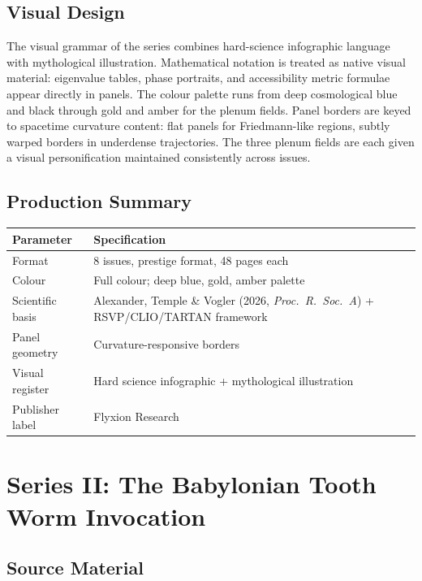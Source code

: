\documentclass[12pt, a4paper]{article}
\begin{document}
\subsection{Visual Design}

The visual grammar of the series combines hard-science infographic language with mythological illustration. Mathematical notation is treated as native visual material: eigenvalue tables, phase portraits, and accessibility metric formulae appear directly in panels. The colour palette runs from deep cosmological blue and black through gold and amber for the plenum fields. Panel borders are keyed to spacetime curvature content: flat panels for Friedmann-like regions, subtly warped borders in underdense trajectories. The three plenum fields are each given a visual personification maintained consistently across issues.

\subsection{Production Summary}

\begin{center}
\begin{tabular}{lp{9cm}}
\toprule
\textbf{Parameter} & \textbf{Specification} \\
\midrule
Format & 8 issues, prestige format, 48 pages each \\
Colour & Full colour; deep blue, gold, amber palette \\
Scientific basis & Alexander, Temple \& Vogler (2026, \textit{Proc.\ R.\ Soc.\ A}) + RSVP/CLIO/TARTAN framework \\
Panel geometry & Curvature-responsive borders \\
Visual register & Hard science infographic + mythological illustration \\
Publisher label & Flyxion Research \\
\bottomrule
\end{tabular}
\end{center}

\newpage
\section{Series II: The Babylonian Tooth Worm Invocation}

\subsection{Source Material}
\end{document}
